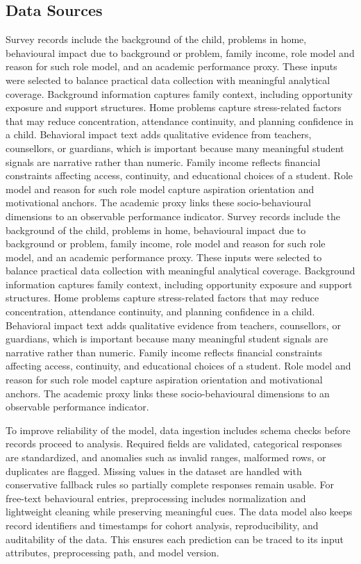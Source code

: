 \documentclass[conference]{IEEEtran}
\begin{document}
\subsection{Data Sources}

Survey records include the background of the child, problems in home, behavioural impact due to background or problem, family income, role model and reason for such role model, and an academic performance proxy. These inputs were selected to balance practical data collection with meaningful analytical coverage. Background information captures family context, including opportunity exposure and support structures. Home problems capture stress-related factors that may reduce concentration, attendance continuity, and planning confidence in a child. Behavioral impact text adds qualitative evidence from teachers, counsellors, or guardians, which is important because many meaningful student signals are narrative rather than numeric. Family income reflects financial constraints affecting access, continuity, and educational choices of a student. Role model and reason for such role model capture aspiration orientation and motivational anchors. The academic proxy links these socio-behavioural dimensions to an observable performance indicator.
Survey records include the background of the child, problems in home, behavioural impact due to background or problem, family income, role model and reason for such role model, and an academic performance proxy. These inputs were selected to balance practical data collection with meaningful analytical coverage. Background information captures family context, including opportunity exposure and support structures. Home problems capture stress-related factors that may reduce concentration, attendance continuity, and planning confidence in a child. Behavioral impact text adds qualitative evidence from teachers, counsellors, or guardians, which is important because many meaningful student signals are narrative rather than numeric. Family income reflects financial constraints affecting access, continuity, and educational choices of a student. Role model and reason for such role model capture aspiration orientation and motivational anchors. The academic proxy links these socio-behavioural dimensions to an observable performance indicator.

To improve reliability of the model, data ingestion includes schema checks before records proceed to analysis. Required fields are validated, categorical responses are standardized, and anomalies such as invalid ranges, malformed rows, or duplicates are flagged. Missing values in the dataset are handled with conservative fallback rules so partially complete responses remain usable. For free-text behavioural entries, preprocessing includes normalization and lightweight cleaning while preserving meaningful cues. The data model also keeps record identifiers and timestamps for cohort analysis, reproducibility, and auditability of the data. This ensures each prediction can be traced to its input attributes, preprocessing path, and model version.
\end{document}
